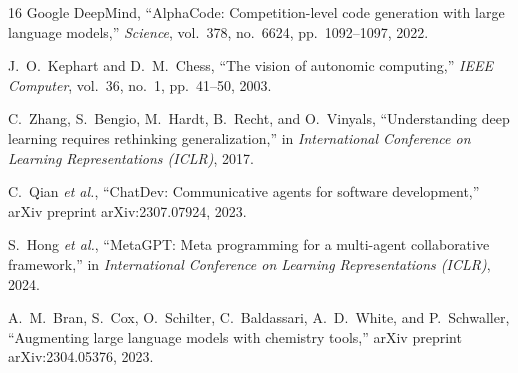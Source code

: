 \documentclass[conference]{IEEEtran}
\begin{document}
\begin{thebibliography}{16}
Google DeepMind, ``AlphaCode: Competition-level code generation with large language
models,'' \emph{Science}, vol.~378, no.~6624, pp.~1092--1097, 2022.

J.~O.~Kephart and D.~M.~Chess, ``The vision of autonomic computing,'' \emph{IEEE
Computer}, vol.~36, no.~1, pp.~41--50, 2003.

C.~Zhang, S.~Bengio, M.~Hardt, B.~Recht, and O.~Vinyals, ``Understanding deep learning
requires rethinking generalization,'' in \emph{International Conference on Learning
Representations (ICLR)}, 2017.

C.~Qian \emph{et al.}, ``ChatDev: Communicative agents for software development,''
arXiv preprint arXiv:2307.07924, 2023.

S.~Hong \emph{et al.}, ``MetaGPT: Meta programming for a multi-agent collaborative
framework,'' in \emph{International Conference on Learning Representations (ICLR)}, 2024.

A.~M.~Bran, S.~Cox, O.~Schilter, C.~Baldassari, A.~D.~White, and P.~Schwaller,
``Augmenting large language models with chemistry tools,'' arXiv preprint
arXiv:2304.05376, 2023.

\end{thebibliography}
\end{document}
